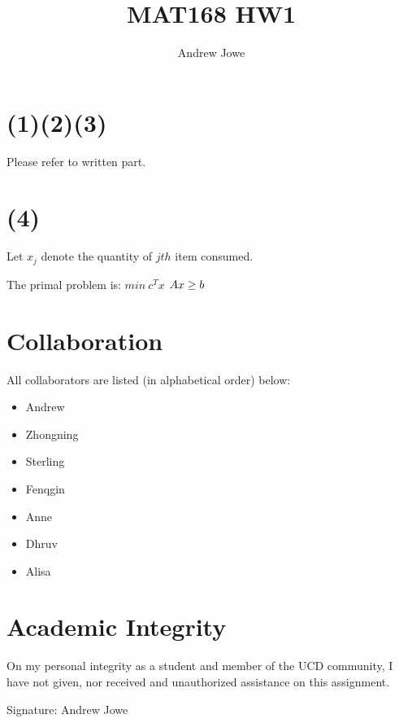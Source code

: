 \documentclass[17pt]{extarticle}
\title{MAT168 HW1}
\author{Andrew Jowe}
\begin{document}
\maketitle
\section*{(1)(2)(3)}
Please refer to written part.

\section*{(4)}
Let $x_j$ denote the quantity of $jth$ item consumed.

\bigskip The primal problem is:
$min \ c^Tx$
$\\Ax \geq b$

\section*{Collaboration}
All collaborators are listed (in alphabetical order) below:
\begin{itemize}
    \item Andrew
    \item Zhongning
    \item Sterling
    \item Fenqgin
    \item Anne
    \item Dhruv
    \item Alisa
\end{itemize}

\section*{Academic Integrity}
On my personal integrity as a student and member of the UCD community, I have not given, nor received and unauthorized assistance on this assignment.

Signature: Andrew Jowe
\end{document}
